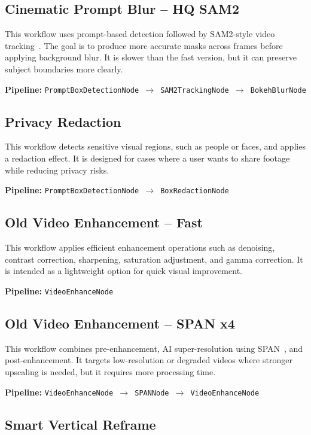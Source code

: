 \documentclass[11pt,a4paper]{article}
\begin{document}
\subsection{Cinematic Prompt Blur -- HQ SAM2}

This workflow uses prompt-based detection followed by SAM2-style video tracking~\cite{ravi2024sam2}. The goal is to produce more accurate masks across frames before applying background blur. It is slower than the fast version, but it can preserve subject boundaries more clearly.

\noindent\textbf{Pipeline:} \texttt{PromptBoxDetectionNode $\rightarrow$ SAM2TrackingNode $\rightarrow$ BokehBlurNode}

\subsection{Privacy Redaction}

This workflow detects sensitive visual regions, such as people or faces, and applies a redaction effect. It is designed for cases where a user wants to share footage while reducing privacy risks.

\noindent\textbf{Pipeline:} \texttt{PromptBoxDetectionNode $\rightarrow$ BoxRedactionNode}

\subsection{Old Video Enhancement -- Fast}

This workflow applies efficient enhancement operations such as denoising, contrast correction, sharpening, saturation adjustment, and gamma correction. It is intended as a lightweight option for quick visual improvement.

\noindent\textbf{Pipeline:} \texttt{VideoEnhanceNode}

\subsection{Old Video Enhancement -- SPAN x4}

This workflow combines pre-enhancement, AI super-resolution using SPAN~\cite{wan2024span}, and post-enhancement. It targets low-resolution or degraded videos where stronger upscaling is needed, but it requires more processing time.

\noindent\textbf{Pipeline:} \texttt{VideoEnhanceNode $\rightarrow$ SPANNode $\rightarrow$ VideoEnhanceNode}

\subsection{Smart Vertical Reframe}
\end{document}
